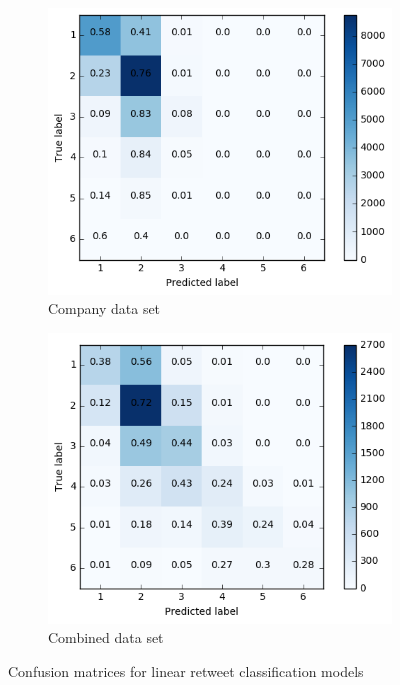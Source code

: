 \begin{figure}[h]
\begin{subfigure}{.4\textwidth}
  \includegraphics[width=.95\linewidth]{img/corp_lin_cm_favorites}
  \caption{Company data set}
  \label{fig:lin_fav_distr_sub3}
\end{subfigure}%
\begin{subfigure}{.4\textwidth}
  \includegraphics[width=.95\linewidth]{img/comb_lin_cm_favorites}
  \caption{Combined data set}
  \label{fig:lin_fav_distr_sub3}
\end{subfigure}%
\caption{Confusion matrices for linear retweet classification models}
\label{fig:lin_fav_cm}
\end{figure}

